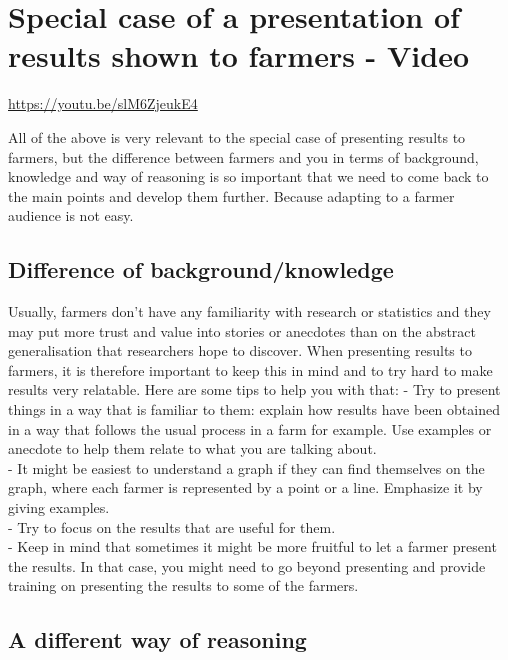 \documentclass[
  titlepage]{book}
\begin{document}
\hypertarget{special-case-of-a-presentation-of-results-shown-to-farmers---video}{%
\section{Special case of a presentation of results shown to farmers - Video}\label{special-case-of-a-presentation-of-results-shown-to-farmers---video}}

\label{fig:unnamed-chunk-42}\url{https://youtu.be/slM6ZjeukE4}

All of the above is very relevant to the special case of presenting results to farmers, but the difference between farmers and you in terms of background, knowledge and way of reasoning is so important that we need to come back to the main points and develop them further. Because adapting to a farmer audience is not easy.

\hypertarget{difference-of-backgroundknowledge}{%
\subsection{Difference of background/knowledge}\label{difference-of-backgroundknowledge}}

Usually, farmers don't have any familiarity with research or statistics and they may put more trust and value into stories or anecdotes than on the abstract generalisation that researchers hope to discover. When presenting results to farmers, it is therefore important to keep this in mind and to try hard to make results very relatable. Here are some tips to help you with that:
- Try to present things in a way that is familiar to them: explain how results have been obtained in a way that follows the usual process in a farm for example. Use examples or anecdote to help them relate to what you are talking about.\\
- It might be easiest to understand a graph if they can find themselves on the graph, where each farmer is represented by a point or a line. Emphasize it by giving examples.\\
- Try to focus on the results that are useful for them.\\
- Keep in mind that sometimes it might be more fruitful to let a farmer present the results. In that case, you might need to go beyond presenting and provide training on presenting the results to some of the farmers.

\hypertarget{a-different-way-of-reasoning}{%
\subsection{A different way of reasoning}\label{a-different-way-of-reasoning}}
\end{document}
